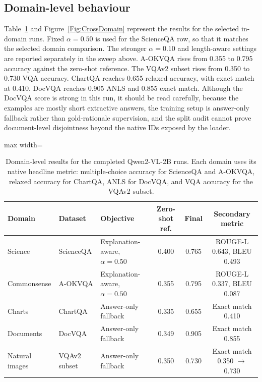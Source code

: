 \documentclass[preprint,12pt]{elsarticle}
\begin{document}
\subsection{Domain-level behaviour}
Table~\ref{tab:domain_results} and Figure~\ref{Fig:CrossDomain} represent the results for the selected in-domain runs.
Fixed $\alpha=0.50$ is used for the ScienceQA row, so that it matches the selected domain comparison.
The stronger $\alpha=0.10$ and length-aware settings are reported separately in the sweep above.
A-OKVQA rises from 0.355 to 0.795 accuracy against the zero-shot reference.
The VQAv2 subset rises from 0.350 to 0.730 VQA accuracy.
ChartQA reaches 0.655 relaxed accuracy, with exact match at 0.410.
DocVQA reaches 0.905 ANLS and 0.855 exact match.
Although the DocVQA score is strong in this run, it should be read carefully, because the examples are mostly short extractive answers, the training setup is answer-only fallback rather than gold-rationale supervision, and the split audit cannot prove document-level disjointness beyond the native IDs exposed by the loader.

\begin{table}[!ht]
\centering
\caption{Domain-level results for the completed Qwen2-VL-2B runs. Each domain uses its native headline metric: multiple-choice accuracy for ScienceQA and A-OKVQA, relaxed accuracy for ChartQA, ANLS for DocVQA, and VQA accuracy for the VQAv2 subset.}
\label{tab:domain_results}
\scriptsize
\begin{adjustbox}{max width=\textwidth}
\begin{tabular}{|l|l|l|c|c|c|}
\hline
\textbf{Domain} & \textbf{Dataset} & \textbf{Objective} & \textbf{Zero-shot ref.} & \textbf{Final} & \textbf{Secondary metric} \\ \hline
Science & ScienceQA & Explanation-aware, $\alpha=0.50$ & 0.400 & 0.765 & ROUGE-L 0.643, BLEU 0.493 \\
Commonsense & A-OKVQA & Explanation-aware, $\alpha=0.50$ & 0.355 & 0.795 & ROUGE-L 0.337, BLEU 0.087 \\
Charts & ChartQA & Answer-only fallback & 0.335 & 0.655 & Exact match 0.410 \\
Documents & DocVQA & Answer-only fallback & 0.349 & 0.905 & Exact match 0.855 \\
Natural images & VQAv2 subset & Answer-only fallback & 0.350 & 0.730 & Exact match 0.350 $\rightarrow$ 0.730 \\ \hline
\end{tabular}
\end{adjustbox}
\end{table}
\end{document}
